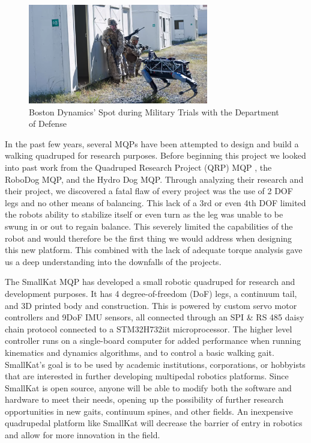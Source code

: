     \begin{figure}[h]
        \centering
        \parbox{0.7\linewidth}{\includegraphics[width=0.7\textwidth]{figures/BostonDynamicsSpotMilitary.png}}
        \caption{Boston Dynamics' Spot during Military Trials with the Department of Defense}
        \label{fig:SpotMilitary} 
    \end{figure}
     
    In the past few years, several MQPs have been attempted to design and build a walking quadruped for research purposes. Before beginning this project we looked into past work from the Quadruped Research Project (QRP) MQP \cite{QRP_MQP}, the RoboDog MQP\cite{RoboDog_MQP}, and the Hydro Dog MQP. Through analyzing their research and their project, we discovered a fatal flaw of every project was the use of 2 DOF legs and no other means of balancing. This lack of a 3rd or even 4th DOF limited the robots ability to stabilize itself or even turn as the leg was unable to be swung in or out to regain balance. This severely limited the capabilities of the robot and would therefore be the first thing we would address when designing this new platform.  This combined with the lack of adequate torque analysis gave us a deep understanding into the downfalls of the projects. 

    The SmallKat MQP has developed a small robotic quadruped for research and development purposes. It has 4 degree-of-freedom (DoF) legs, a continuum tail, and 3D printed body and construction. This is powered by custom servo motor controllers and 9DoF IMU sensors, all connected through an SPI \& RS 485 daisy chain protocol connected to a STM32H732iit microprocessor. The higher level controller runs on a single-board computer for added performance when running kinematics and dynamics algorithms, and to control a basic walking gait. SmallKat's goal is to be used by academic institutions, corporations, or hobbyists that are interested in further developing multipedal robotics platforms. Since SmallKat is open source, anyone will be able to modify both the software and hardware to meet their needs, opening up the possibility of further research opportunities in new gaits, continuum spines, and other fields. An inexpensive quadrupedal platform like SmallKat will decrease the barrier of entry in robotics and allow for more innovation in the field.
